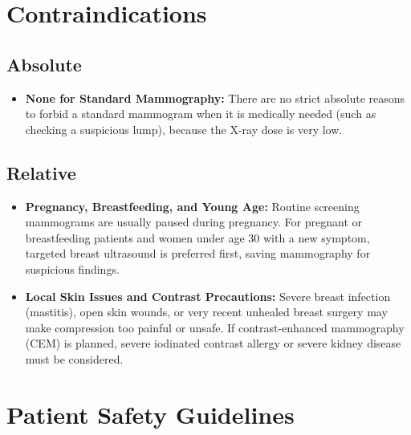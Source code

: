 \section{Contraindications}

\subsection{Absolute}

\begin{itemize}
    \item \textbf{None for Standard Mammography:} There are no strict absolute reasons to forbid a standard mammogram when it is medically needed (such as checking a suspicious lump), because the X-ray dose is very low.
\end{itemize}

\subsection{Relative}

\begin{itemize}
    \item \textbf{Pregnancy, Breastfeeding, and Young Age:} Routine screening mammograms are usually paused during pregnancy. For pregnant or breastfeeding patients and women under age 30 with a new symptom, targeted breast ultrasound is preferred first, saving mammography for suspicious findings.
    \item \textbf{Local Skin Issues and Contrast Precautions:} Severe breast infection (mastitis), open skin wounds, or very recent unhealed breast surgery may make compression too painful or unsafe. If contrast-enhanced mammography (CEM) is planned, severe iodinated contrast allergy or severe kidney disease must be considered.
\end{itemize}

\section{Patient Safety Guidelines}

